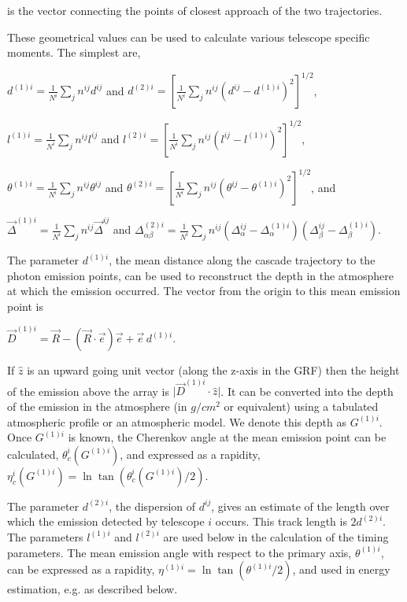 \documentclass[letterpaper]{article}
\begin{document}
is the vector connecting the points of closest approach of the two
trajectories.

These geometrical values can be used to calculate various telescope 
specific moments. The simplest are,

$\displaystyle d^{(1)i} = \frac{1}{N^{i}}\sum\limits_{j}n^{ij}d^{ij}$ and
$\displaystyle d^{(2)i} = \left[ \frac{1}{N^{i}}\sum\limits_{j}n^{ij}(d^{ij}-d^{(1)i})^2\right]^{1/2}$,

$\displaystyle l^{(1)i} = \frac{1}{N^{i}}\sum\limits_{j}n^{ij}l^{ij}$ and
$\displaystyle l^{(2)i} = \left[ \frac{1}{N^{i}}\sum\limits_{j}n^{ij}(l^{ij}-l^{(1)i})^2\right]^{1/2}$,

$\displaystyle \theta^{(1)i} = \frac{1}{N^{i}}\sum\limits_{j}n^{ij}\theta^{ij}$ and
$\displaystyle \theta^{(2)i} = \left[ \frac{1}{N^{i}}\sum\limits_{j}n^{ij}(\theta^{ij}-\theta^{(1)i})^2\right]^{1/2}$, and

$\displaystyle \vec{\Delta}^{(1)i} = \frac{1}{N^{i}}\sum\limits_{j}n^{ij}\vec{\Delta}^{ij}$ and
$\displaystyle \Delta_{\alpha\beta}^{(2)i} = \frac{1}{N^{i}}\sum\limits_{j}n^{ij}(\Delta_\alpha^{ij}-\Delta_\alpha^{(1)i})(\Delta_\beta^{ij}-\Delta_\beta^{(1)i})$.

The parameter $d^{(1)i}$, the mean distance along the
cascade trajectory to the photon emission points, can be used to
reconstruct the depth in the atmosphere at which the emission occurred.
The vector from the origin to this mean emission point is

$\displaystyle \vec{D}^{(1)i}
=\vec{R}-\left(\vec{R}\cdot\vec{e}\right)\vec{e}+\vec{e}\,d^{(1)i}$.

If $\hat{z}$ is an upward going unit vector (along the z-axis in the
GRF) then the height of the emission above the array is
$\vert\vec{D}^{(1)i}\cdot\hat{z}\vert$. It can be converted into the
depth of the emission in the atmosphere (in $g/cm^2$ or equivalent)
using a tabulated atmospheric profile or an atmospheric model. We
denote this depth as $G^{(1)i}$. Once $G^{(1)i}$ is known, the
Cherenkov angle at the mean emission point can be calculated,
$\theta_c^i(G^{(1)i})$, and expressed as a rapidity,
$\eta_c^i(G^{(1)i})=\ln\tan(\theta_c^i(G^{(1)i})/2)$.

The parameter $d^{(2)i}$, the dispersion of $d^{ij}$, gives an
estimate of the length over which the emission detected by telescope
$i$ occurs. This track length is $2d^{(2)i}$. The parameters
$l^{(1)i}$ and $l^{(2)i}$ are used below in the calculation of the
timing parameters. The mean emission angle with respect to the primary
axis, $\theta^{(1)i}$, can be expressed as a rapidity,
$\eta^{(1)i}=\ln\tan(\theta^{(1)i}/2)$, and used in energy estimation,
e.g. as described below.
\end{document}
